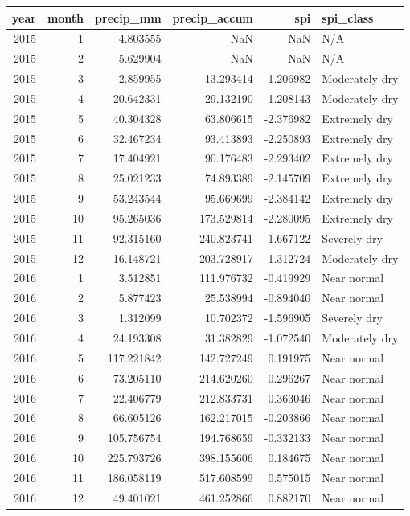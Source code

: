 \begin{tabular}{rrrrrl}
\toprule
year & month & precip\_mm & precip\_accum & spi & spi\_class \\
\midrule
2015 & 1 & 4.803555 & NaN & NaN & N/A \\
2015 & 2 & 5.629904 & NaN & NaN & N/A \\
2015 & 3 & 2.859955 & 13.293414 & -1.206982 & Moderately dry \\
2015 & 4 & 20.642331 & 29.132190 & -1.208143 & Moderately dry \\
2015 & 5 & 40.304328 & 63.806615 & -2.376982 & Extremely dry \\
2015 & 6 & 32.467234 & 93.413893 & -2.250893 & Extremely dry \\
2015 & 7 & 17.404921 & 90.176483 & -2.293402 & Extremely dry \\
2015 & 8 & 25.021233 & 74.893389 & -2.145709 & Extremely dry \\
2015 & 9 & 53.243544 & 95.669699 & -2.384142 & Extremely dry \\
2015 & 10 & 95.265036 & 173.529814 & -2.280095 & Extremely dry \\
2015 & 11 & 92.315160 & 240.823741 & -1.667122 & Severely dry \\
2015 & 12 & 16.148721 & 203.728917 & -1.312724 & Moderately dry \\
2016 & 1 & 3.512851 & 111.976732 & -0.419929 & Near normal \\
2016 & 2 & 5.877423 & 25.538994 & -0.894040 & Near normal \\
2016 & 3 & 1.312099 & 10.702372 & -1.596905 & Severely dry \\
2016 & 4 & 24.193308 & 31.382829 & -1.072540 & Moderately dry \\
2016 & 5 & 117.221842 & 142.727249 & 0.191975 & Near normal \\
2016 & 6 & 73.205110 & 214.620260 & 0.296267 & Near normal \\
2016 & 7 & 22.406779 & 212.833731 & 0.363046 & Near normal \\
2016 & 8 & 66.605126 & 162.217015 & -0.203866 & Near normal \\
2016 & 9 & 105.756754 & 194.768659 & -0.332133 & Near normal \\
2016 & 10 & 225.793726 & 398.155606 & 0.184675 & Near normal \\
2016 & 11 & 186.058119 & 517.608599 & 0.575015 & Near normal \\
2016 & 12 & 49.401021 & 461.252866 & 0.882170 & Near normal \\

\end{tabular}
